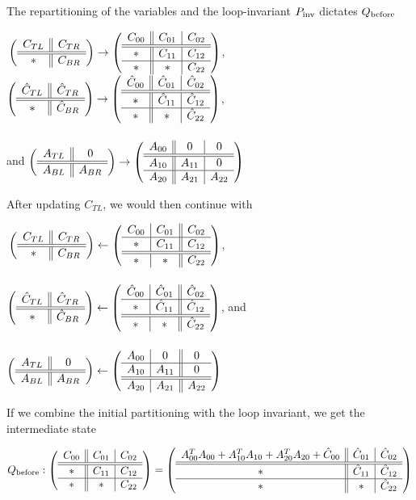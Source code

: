 The repartitioning of the variables and the loop-invariant $P_{\rm inv} $ dictates $Q_{\rm before} $

{
\normalsize
$ \\
\left( \begin{array}{c || c}  C_{TL}  &  C_{TR}  \\ \hline \hline  *  &  C_{BR}  \end{array} \right)
\rightarrow
\left( \begin{array}{c || c | c}  C_{00}  &  C_{01}  &  C_{02}  \\ \hline \hline  *  &  C_{11}  &  C_{12}  \\ \hline  *  &  *  &  C_{22}  \end{array} \right)
$,
$
\left( \begin{array}{c || c}  \hat{C}_{TL}  &  \hat{C}_{TR}  \\ \hline \hline  *  &  \hat{C}_{BR}  \end{array} \right)
\rightarrow
\left( \begin{array}{c || c | c}  \hat{C}_{00}  &  \hat{C}_{01}  &  \hat{C}_{02}  \\ \hline \hline  *  &  \hat{C}_{11}  &  \hat{C}_{12}  \\ \hline  *  &  *  &  \hat{C}_{22}  \end{array} \right)
$, \\ \\ and
$
\left( \begin{array}{c || c}  A_{TL}  &  0  \\ \hline \hline  A_{BL}  &  A_{BR}  \end{array} \right)
\rightarrow
\left( \begin{array}{c || c | c}  A_{00}  &  0  &  0  \\ \hline \hline  A_{10}  &  A_{11}  &  0  \\ \hline  A_{20}  &  A_{21}  &  A_{22}  \end{array} \right)
$ \\
}

After updating $ C_{TL} $, we would then continue with

{
\normalsize
$ \\
\left( \begin{array}{c || c}  C_{TL}  &  C_{TR}  \\ \hline \hline  *  &  C_{BR}  \end{array} \right)
\leftarrow
\left( \begin{array}{c | c || c}  C_{00}  &  C_{01}  &  C_{02}  \\ \hline  *  &  C_{11}  &  C_{12}  \\ \hline \hline  *  &  *  &  C_{22}  \end{array} \right)
$, \\ \\
$
\left( \begin{array}{c || c}  \hat{C}_{TL}  &  \hat{C}_{TR}  \\ \hline \hline  *  &  \hat{C}_{BR}  \end{array} \right)
\leftarrow
\left( \begin{array}{c | c || c}  \hat{C}_{00}  &  \hat{C}_{01}  &  \hat{C}_{02}  \\ \hline  *  &  \hat{C}_{11}  &  \hat{C}_{12}  \\ \hline \hline  *  &  *  &  \hat{C}_{22}  \end{array} \right)
$, and \\ \\
$
\left( \begin{array}{c || c}  A_{TL}  &  0  \\ \hline \hline  A_{BL}  &  A_{BR}  \end{array} \right)
\leftarrow
\left( \begin{array}{c | c || c}  A_{00}  &  0  &  0  \\ \hline  A_{10}  &  A_{11}  &  0  \\ \hline \hline  A_{20}  &  A_{21}  &  A_{22}  \end{array} \right)
$ \\
}

If we combine the initial partitioning with the loop invariant, we get the intermediate state

{
$  \\
Q_{\rm before}:
\left( \begin{array}{c || c | c}  C_{00}  &  C_{01}  &  C_{02}  \\ \hline \hline  *  &  C_{11}  &  C_{12}  \\ \hline  *  &  *  &  C_{22}  \end{array} \right)
=
\left( \begin{array}{c || c | c}  A_{00}^T A_{00} + A_{10}^T A_{10} + A_{20}^T A_{20} + \hat{C}_{00}  &  \hat{C}_{01}  &  \hat{C}_{02}  \\ \hline \hline  *  &  \hat{C}_{11}  &  \hat{C}_{12}  \\ \hline  *  &  *  &  \hat{C}_{22}  \end{array} \right)
$
}
\\
\\

